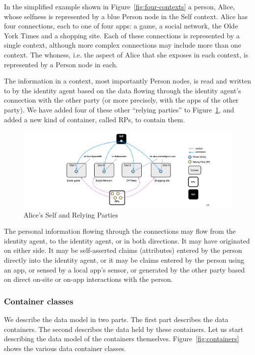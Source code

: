 \documentclass[11pt, oneside]{article}   	%
\begin{document}
In the simplified example shown in Figure~\ref{fig:four-contexts} a person, Alice, whose selfness is represented by a blue Person node in the Self context. Alice has four connections, each to one of four apps: a game, a social network, the Olde York Times and a shopping site. Each of these connections is represented by a single context, although more complex connections may include more than one context. The whoness, i.e. the aspect of Alice that she exposes in each context, is represented by a Person node in each.

The information in a context, most importantly Person nodes, is read and written to by the identity agent based on the data flowing through the identity agent's connection with the other party (or more precisely, with the apps of the other party). We have added four of these other ``relying parties'' to Figure~\ref{fig:RPs-container}, and added a new kind of container, called RPs, to contain them. 

\begin{figure}[h!]
\includegraphics[width=\textwidth]{./images/example2.png}
\caption{Alice's Self and Relying Parties}
\label{fig:RPs-container}
\end{figure}

The personal information flowing through the connections may flow from the identity agent, to the identity agent, or in both directions. It may have originated on either side. It may be self-asserted claims (attributes) entered by the person directly into the identity agent, or it may be claims entered by the person using an app, or sensed by a local app's sensor, or generated by the other party based on direct on-site or on-app interactions with the person.

\subsubsection{Container classes}

We describe the data model in two parts. The first part describes the data containers. The second describes the data held by these containers. Let us start describing the data model of the containers themselves. Figure~\ref{fig:containers} shows the various data container classes. 
\end{document}
